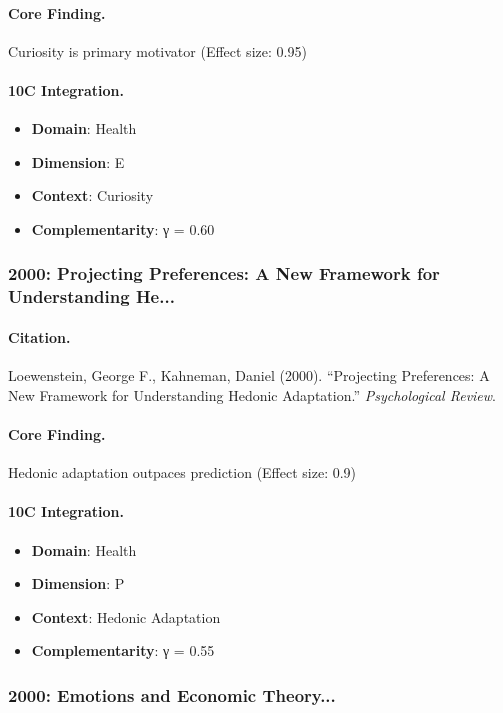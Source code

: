 \paragraph{Core Finding.}
Curiosity is primary motivator (Effect size: 0.95)

\paragraph{10C Integration.}
\begin{itemize}[nosep]
  \item \textbf{Domain}: Health
  \item \textbf{Dimension}: E
  \item \textbf{Context}: Curiosity
  \item \textbf{Complementarity}: γ = 0.60
\end{itemize}

\subsubsection{2000: Projecting Preferences: A New Framework for Understanding He...}

\paragraph{Citation.}
Loewenstein, George F., Kahneman, Daniel (2000). ``Projecting Preferences: A New Framework for Understanding Hedonic Adaptation.''
\textit{Psychological Review}.

\paragraph{Core Finding.}
Hedonic adaptation outpaces prediction (Effect size: 0.9)

\paragraph{10C Integration.}
\begin{itemize}[nosep]
  \item \textbf{Domain}: Health
  \item \textbf{Dimension}: P
  \item \textbf{Context}: Hedonic Adaptation
  \item \textbf{Complementarity}: γ = 0.55
\end{itemize}

\subsubsection{2000: Emotions and Economic Theory...}

